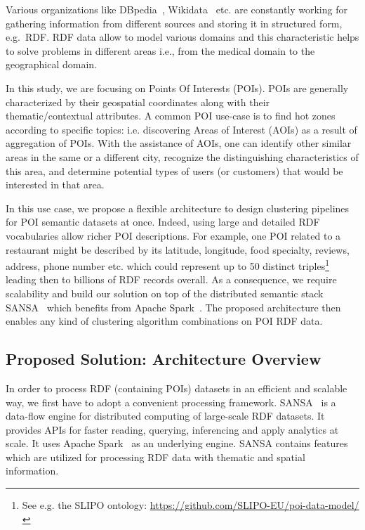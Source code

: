 Various organizations like DBpedia~\cite{dbpedia-swj}, Wikidata~\cite{Vrandecic:2014:WFC:2661061.2629489} etc. are constantly working for gathering information from different sources and storing it in structured form, e.g.~\gls{RDF}.
RDF data allow to model various domains and this characteristic helps to solve problems in different areas i.e., from the medical domain to the geographical domain. 

In this study, we are focusing on Points Of Interests (POIs).
POIs are generally characterized by their geospatial coordinates along with their thematic/contextual attributes.
A common POI use-case is to find hot zones according to specific topics: i.e. discovering Areas of Interest (AOIs) as a result of aggregation of POIs.
With the assistance of AOIs, one can identify other similar areas in the same or a different city, recognize the distinguishing characteristics of this area, and determine potential types of users (or customers) that would be interested in that area.

In this use case, we propose a flexible architecture to design clustering pipelines for POI semantic datasets at once.
Indeed, using large and detailed RDF vocabularies allow richer POI descriptions.
For example, one POI related to a restaurant might be described by its latitude, longitude, food specialty, reviews, address, phone number etc. which could represent up to 50 distinct triples\footnote{\scriptsize See e.g. the SLIPO ontology: \url{https://github.com/SLIPO-EU/poi-data-model/}} leading then to billions of RDF records overall.
As a consequence, we require scalability and build our solution on top of the distributed semantic stack SANSA~\cite{lehmann-2017-sansa-iswc} which benefits from Apache Spark~\cite{zaharia2012resilient}.
The proposed architecture then enables any kind of clustering algorithm combinations on POI RDF data.

\subsection{Proposed Solution: Architecture Overview}
In order to process RDF (containing POIs) datasets in an efficient and scalable way, we first have to adopt a convenient processing framework.
SANSA~\cite{lehmann-2017-sansa-iswc} is a data-flow engine for distributed computing of large-scale RDF datasets. 
It provides APIs for faster reading, querying, inferencing and apply analytics at scale.
It uses Apache Spark~\cite{zaharia2012resilient} as an underlying engine.
SANSA contains features which are utilized for processing RDF data with thematic and spatial information.

